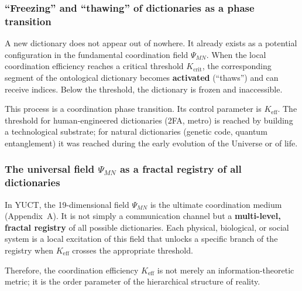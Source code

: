 \documentclass[12pt,a4paper]{article}
\theoremstyle{remark}
\begin{document}
	\subsubsection{``Freezing'' and ``thawing'' of dictionaries as a phase transition}
	
	A new dictionary does not appear out of nowhere.  It already exists as
	a potential configuration in the fundamental coordination field
	$\Psi_{MN}$.  When the local coordination efficiency reaches a critical
	threshold $K_{\mathrm{crit}}$, the corresponding segment of the
	ontological dictionary becomes \textbf{activated} (``thaws'') and can
	receive indices.  Below the threshold, the dictionary is frozen and
	inaccessible.
	
	This process is a coordination phase transition.  Its control parameter
	is $K_{\mathrm{eff}}$.  The threshold for human-engineered dictionaries
	(2FA, metro) is reached by building a technological substrate; for
	natural dictionaries (genetic code, quantum entanglement) it was
	reached during the early evolution of the Universe or of life.
	
	\subsubsection{The universal field \texorpdfstring{\(\Psi_{MN}\)}{Psi\_MN} as a fractal registry of all dictionaries}
	
	In YUCT, the 19-dimensional field $\Psi_{MN}$ is the ultimate
	coordination medium (Appendix~A).  It is not simply a communication
	channel but a \textbf{multi-level, fractal registry} of all possible
	dictionaries.  Each physical, biological, or social system is a local
	excitation of this field that unlocks a specific branch of the registry
	when $K_{\mathrm{eff}}$ crosses the appropriate threshold.
	
	Therefore, the coordination efficiency $K_{\mathrm{eff}}$ is not
	merely an information-theoretic metric; it is the order parameter of
	the hierarchical structure of reality.
	
\end{document}
